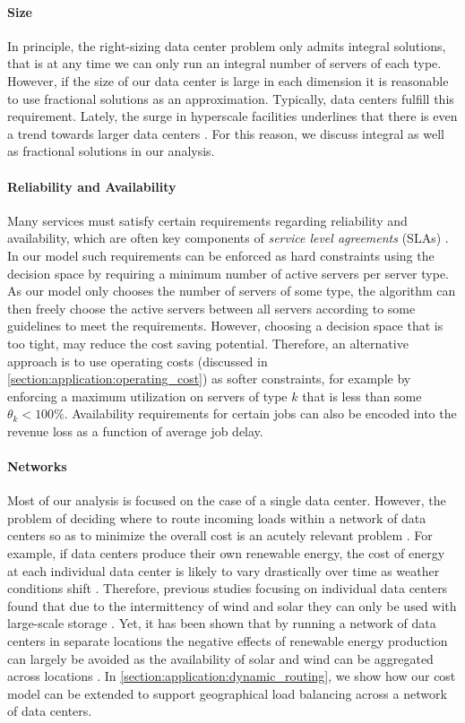 \paragraph{Size} In principle, the right-sizing data center problem only admits integral solutions, that is at any time we can only run an integral number of servers of each type. However, if the size of our data center is large in each dimension it is reasonable to use fractional solutions as an approximation. Typically, data centers fulfill this requirement. Lately, the surge in hyperscale facilities underlines that there is even a trend towards larger data centers \cite{Jones2018}. For this reason, we discuss integral as well as fractional solutions in our analysis.

\paragraph{Reliability and Availability} Many services must satisfy certain requirements regarding reliability and availability, which are often key components of \emph{service level agreements} (SLAs) \cite{Lin2011}. In our model such requirements can be enforced as hard constraints using the decision space by requiring a minimum number of active servers per server type. As our model only chooses the number of servers of some type, the algorithm can then freely choose the active servers between all servers according to some guidelines to meet the requirements. However, choosing a decision space that is too tight, may reduce the cost saving potential. Therefore, an alternative approach is to use operating costs (discussed in \autoref{section:application:operating_cost}) as softer constraints, for example by enforcing a maximum utilization on servers of type $k$ that is less than some $\theta_k < 100\%$. Availability requirements for certain jobs can also be encoded into the revenue loss as a function of average job delay.

\paragraph{Networks} Most of our analysis is focused on the case of a single data center. However, the problem of deciding where to route incoming loads within a network of data centers so as to minimize the overall cost is an acutely relevant problem \cite{Miller2021}. For example, if data centers produce their own renewable energy, the cost of energy at each individual data center is likely to vary drastically over time as weather conditions shift \cite{Lin2012}. Therefore, previous studies focusing on individual data centers found that due to the intermittency of wind and solar they can only be used with large-scale storage \cite{Gmach2010, Gmach2010_2}. Yet, it has been shown that by running a network of data centers in separate locations the negative effects of renewable energy production can largely be avoided as the availability of solar and wind can be aggregated across locations \cite{Lin2012}. In \autoref{section:application:dynamic_routing}, we show how our cost model can be extended to support geographical load balancing across a network of data centers.

